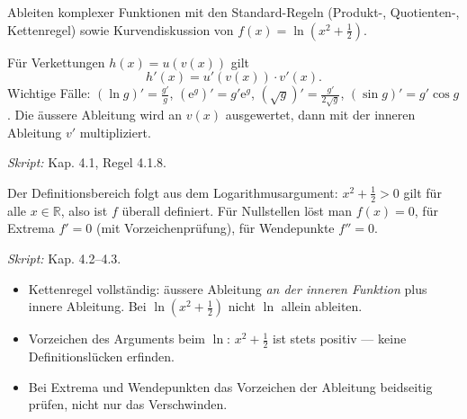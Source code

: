 

Ableiten komplexer Funktionen mit den Standard-Regeln (Produkt-, Quotienten-,
Kettenregel) sowie Kurvendiskussion von $f(x)=\ln(x^2+\tfrac12)$.

\begin{werkzeugkasten}[Kettenregel]
Für Verkettungen $h(x)=u(v(x))$ gilt
\begin{equation}
  h'(x)=u'(v(x))\cdot v'(x).
\end{equation}
Wichtige Fälle: $(\ln g)'=\frac{g'}{g}$, $(\mathrm e^{g})'=g'\mathrm e^{g}$,
$(\sqrt{g})'=\frac{g'}{2\sqrt g}$, $(\sin g)'=g'\cos g$. Die äussere Ableitung
wird an $v(x)$ ausgewertet, dann mit der inneren Ableitung $v'$ multipliziert.

\textit{Skript:} Kap. 4.1, Regel 4.1.8.
\end{werkzeugkasten}

\begin{werkzeugkasten}[Kurvendiskussion von $f(x)=\ln(x^2+\tfrac12)$]
Der Definitionsbereich folgt aus dem Logarithmusargument: $x^2+\tfrac12>0$ gilt
für alle $x\in\mathbb R$, also ist $f$ überall definiert. Für Nullstellen löst
man $f(x)=0$, für Extrema $f'=0$ (mit Vorzeichenprüfung), für Wendepunkte
$f''=0$.

\textit{Skript:} Kap. 4.2--4.3.
\end{werkzeugkasten}

\begin{achtung}
\begin{itemize}
  \item Kettenregel vollständig: äussere Ableitung \emph{an der inneren Funktion}
        plus innere Ableitung. Bei $\ln(x^2+\tfrac12)$ nicht $\ln$ allein
        ableiten.
  \item Vorzeichen des Arguments beim $\ln$: $x^2+\tfrac12$ ist stets positiv —
        keine Definitionslücken erfinden.
  \item Bei Extrema und Wendepunkten das Vorzeichen der Ableitung beidseitig
        prüfen, nicht nur das Verschwinden.
\end{itemize}
\end{achtung}
